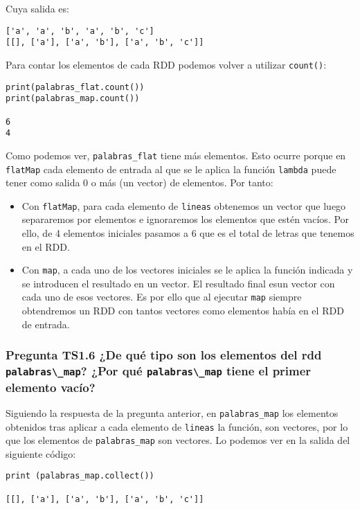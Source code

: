 \documentclass[11pt]{article}
\def\inline{\lstinline[basicstyle=\ttfamily,keywordstyle={}]}
\begin{document}
Cuya salida es:

\begin{verbatim}
['a', 'a', 'b', 'a', 'b', 'c']
[[], ['a'], ['a', 'b'], ['a', 'b', 'c']]
\end{verbatim}

Para contar los elementos de cada RDD podemos volver a utilizar \inline{count()}:

\begin{verbatim}
print(palabras_flat.count())
print(palabras_map.count())

6
4
\end{verbatim}

Como podemos ver, \inline{palabras_flat} tiene más elementos. Esto ocurre porque en \inline{flatMap} cada elemento de entrada al que se le aplica la función \inline{lambda} puede tener como salida 0 o más (un vector) de elementos. Por tanto:

\begin{itemize}
	\item Con \inline{flatMap}, para cada elemento de \inline{lineas} obtenemos un vector que luego separaremos por elementos e ignoraremos los elementos que estén vacíos. Por ello, de 4 elementos iniciales pasamos a 6 que es el total de letras que tenemos en el RDD.
	
	\item Con \inline{map}, a cada uno de los vectores iniciales se le aplica la función indicada y se introducen el resultado en un vector. El resultado final esun vector con cada uno de esos vectores. Es por ello que al ejecutar \inline{map} siempre obtendremos un RDD con tantos vectores como elementos había en el RDD de entrada.
\end{itemize}

\subsubsection*{ Pregunta TS1.6 ¿De qué tipo son los elementos del rdd \inline{palabras\_map}? ¿Por qué \inline{palabras\_map} tiene el primer elemento vacío?}

Siguiendo la respuesta de la pregunta anterior, en \inline{palabras_map} los elementos obtenidos tras aplicar a cada elemento de  \inline{lineas} la función, son vectores, por lo que los elementos de \inline{palabras_map} son vectores.  Lo podemos ver en la salida del siguiente código:

\begin{verbatim}
print (palabras_map.collect())

[[], ['a'], ['a', 'b'], ['a', 'b', 'c']]
\end{verbatim}
\end{document}
